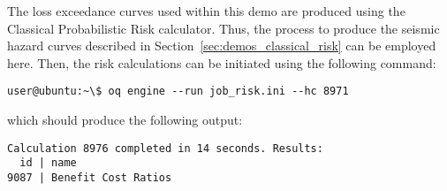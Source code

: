 The loss exceedance curves used within this demo are produced using the
Classical Probabilistic Risk calculator. Thus, the process to produce the
seismic hazard curves described in Section~\ref{sec:demos_classical_risk} can
be employed here. Then, the risk calculations can be initiated using the
following command:

\begin{verbatim}
user@ubuntu:~\$ oq engine --run job_risk.ini --hc 8971
\end{verbatim}

which should produce the following output:

\begin{verbatim}
Calculation 8976 completed in 14 seconds. Results:
  id | name
9087 | Benefit Cost Ratios
\end{verbatim}

